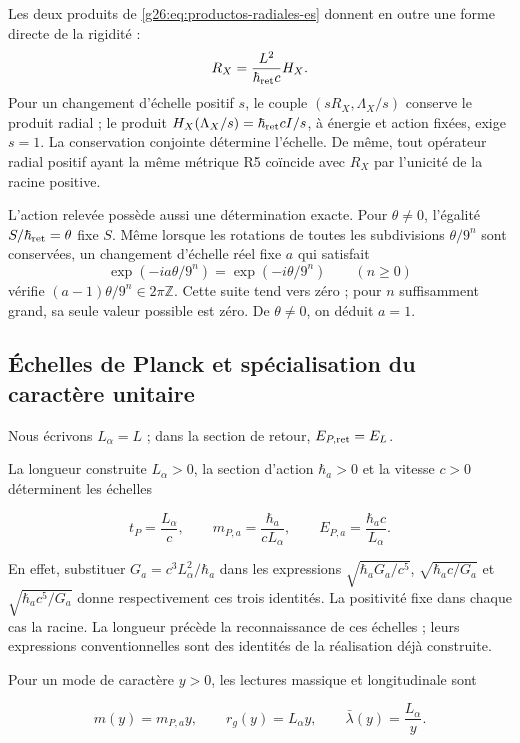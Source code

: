 Les deux produits de \eqref{g26:eq:productos-radiales-es} donnent en outre une
forme directe de la rigidité :
\begin{equation}
 R_X=\frac{L^2}{\hbar_{\rm ret}c}H_X.
 \label{g26:eq:proporcion-operadores-es}
\end{equation}
Pour un changement d'échelle positif \(s\), le couple
\((sR_X,\Lambda_X/s)\) conserve le produit radial ; le produit
\(H_X(\Lambda_X/s)=\hbar_{\rm ret}cI/s\), à énergie et action
fixées, exige \(s=1\). La conservation conjointe détermine l'échelle.
De même, tout opérateur radial positif ayant la même métrique R5
coïncide avec \(R_X\) par l'unicité de la racine positive.

L'action relevée possède aussi une détermination exacte. Pour
\(\theta\ne0\), l'égalité \(S/\hbar_{\rm ret}=\theta\) fixe \(S\).
Même lorsque les rotations de toutes les subdivisions
\(\theta/9^n\) sont conservées, un changement d'échelle réel fixe \(a\) qui satisfait
\[
 \exp(-ia\theta/9^n)=\exp(-i\theta/9^n)
 \qquad(n\geq0)
\]
vérifie \((a-1)\theta/9^n\in2\pi\mathbb Z\). Cette suite tend vers zéro ; pour \(n\) suffisamment grand, sa seule valeur possible est zéro. De \(\theta\ne0\), on déduit \(a=1\).

\subsection{Échelles de Planck et spécialisation du caractère unitaire}

Nous écrivons \(L_\alpha=L\) ; dans la section de retour, \(E_{P,\rm ret}=E_L\).

La longueur construite $L_\alpha>0$, la section d'action $\hbar_a>0$ et la vitesse $c>0$ déterminent les échelles

\[
t_P=\frac{L_\alpha}{c},\qquad
m_{P,a}=\frac{\hbar_a}{cL_\alpha},\qquad
E_{P,a}=\frac{\hbar_a c}{L_\alpha}.
\]

En effet, substituer $G_a=c^3L_\alpha^2/\hbar_a$ dans les expressions
$\sqrt{\hbar_aG_a/c^5}$, $\sqrt{\hbar_ac/G_a}$ et
$\sqrt{\hbar_ac^5/G_a}$ donne respectivement ces trois identités.
La positivité fixe dans chaque cas la racine. La longueur précède la
reconnaissance de ces échelles ; leurs expressions conventionnelles sont
des identités de la réalisation déjà construite.

Pour un mode de caractère $y>0$, les lectures massique et longitudinale sont

\[
m(y)=m_{P,a}y,\qquad r_g(y)=L_\alpha y,\qquad
\bar\lambda(y)=\frac{L_\alpha}{y}.
\]

